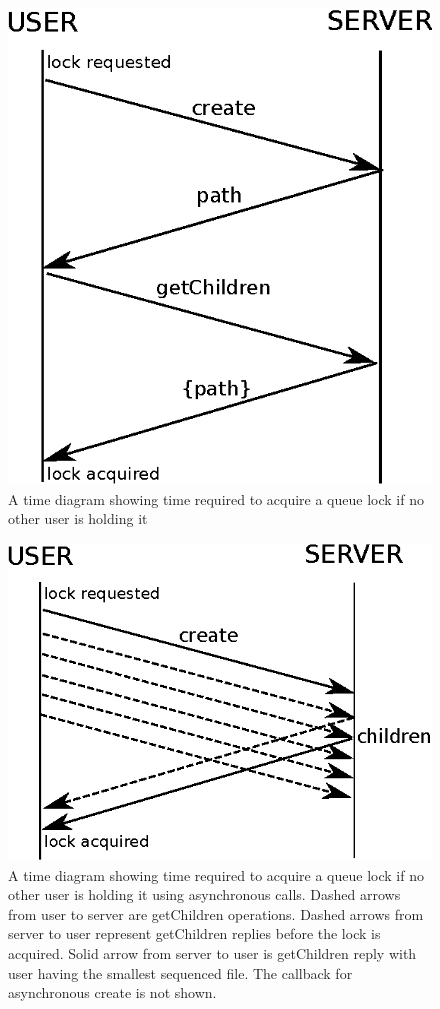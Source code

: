 \begin{figure}[h]
\centering
\includegraphics[scale=0.85]{img/queue_lock_time.eps}
\caption{A time diagram showing time required to acquire a queue lock if no other user is holding it}
\label{fig:queue_lock_time}
\end{figure}

\begin{figure}[h]
\centering
\includegraphics[scale=0.85]{img/async_queue_lock_time.eps}
\caption{A time diagram showing time required to acquire a queue lock if no other user is holding it using asynchronous calls. Dashed arrows from user to server are getChildren operations. Dashed arrows from server to user represent getChildren replies before the lock is acquired. Solid arrow from server to user is getChildren reply with user having the smallest sequenced file. The callback for asynchronous create is not shown.}
\label{fig:async_queue_lock_time}
\end{figure}

